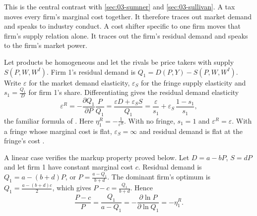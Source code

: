 This is the central contrast with \cref{sec:03-sumner} and \cref{sec:03-sullivan}. A tax moves every firm's
marginal cost together. It therefore traces out market demand and speaks to industry conduct. A cost shifter
specific to one firm moves that firm's supply relation alone. It traces out the firm's residual demand and
speaks to the firm's market power.

\begin{example}\label{ex:03-dominant-fringe}
Let products be homogeneous and let the rivals be price takers with supply $S(P, W, W^I)$. Firm 1's residual
demand is $Q_1 = D(P, Y) - S(P, W, W^I)$. Write $\varepsilon$ for the market demand elasticity,
$\varepsilon_S$ for the fringe supply elasticity and $s_1 = \frac{Q_1}{D}$ for firm 1's share. Differentiating
gives the residual demand elasticity
\begin{equation*}
  \varepsilon^R = -\frac{\partial Q_1}{\partial P}\frac{P}{Q_1}
  = \frac{\varepsilon D + \varepsilon_S S}{Q_1}
  = \frac{\varepsilon}{s_1} + \varepsilon_S\,\frac{1 - s_1}{s_1},
\end{equation*}
the familiar formula of \citet{LandesPosner1981}. Here $\eta^R_1 = -\frac{1}{\varepsilon^R}$. With no
fringe, $s_1 = 1$ and $\varepsilon^R = \varepsilon$. With a fringe whose marginal cost is flat,
$\varepsilon_S = \infty$ and residual demand is flat at the fringe's cost \citep[p.~1049]{Bresnahan1989}.

A linear case verifies the markup property proved below. Let $D = a - bP$, $S = dP$ and let firm 1 have
constant marginal cost $c$. Residual demand is $Q_1 = a - (b + d)P$, or $P = \frac{a - Q_1}{b + d}$. The
dominant firm's optimum is $Q_1 = \frac{a - (b + d)c}{2}$, which gives $P - c = \frac{Q_1}{b + d}$. Hence
\begin{equation*}
  \frac{P - c}{P} = \frac{Q_1}{a - Q_1} = -\frac{\partial \ln P}{\partial \ln Q_1} = -\eta^R_1 .
\end{equation*}
\end{example}

